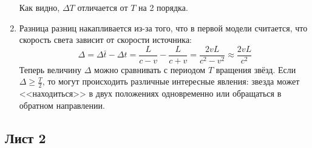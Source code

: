 \documentclass[12pt]{article}
\begin{document}
\begin{enumerate}
Как видно, $\Delta T$ отличается от $T$ на 2 порядка.
\item Разница разниц накапливается из-за того, что в первой модели считается, что скорость света зависит от скорости источника:
\begin{equation}
    \Delta=\Delta\bar{t}-\Delta t = \frac{L}{c-v}-\frac{L}{c+v}=\frac{2vL}{c^2-v^2}\approx\frac{2vL}{c^2}
\end{equation}
Теперь величину $\Delta$ можно сравнивать с периодом $T$ вращения звёзд. Если $\Delta \geq \frac{T}{2}$, то могут происходить различные интересные явления: звезда может <<находиться>> в двух положениях одновременно или обращаться в обратном направлении. 
\end{enumerate}
\subsection{Лист 2}
\end{document}
